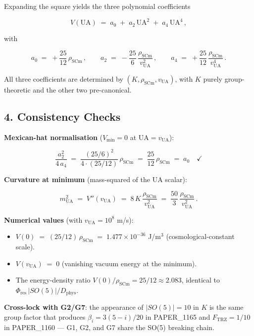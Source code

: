 \documentclass[
]{article}
\providecommand{\tightlist}{%
  \setlength{\itemsep}{0pt}\setlength{\parskip}{0pt}}
\begin{document}
Expanding the square yields the three polynomial coefficients

\[ V(\mathrm{UA}) \;=\; a_0 \;+\; a_2\,\mathrm{UA}^{2} \;+\; a_4\,\mathrm{UA}^{4}\,, \]

with

\[ a_0 \;=\; +\frac{25}{12}\,\rho_{\mathrm{SCm}}\,,\qquad
   a_2 \;=\; -\frac{25}{6}\,\frac{\rho_{\mathrm{SCm}}}{v_{\mathrm{UA}}^{2}}\,,\qquad
   a_4 \;=\; +\frac{25}{12}\,\frac{\rho_{\mathrm{SCm}}}{v_{\mathrm{UA}}^{4}}\,. \]

All three coefficients are determined by
\((K, \rho_{\mathrm{SCm}}, v_{\mathrm{UA}})\), with \(K\) purely
group-theoretic and the other two pre-canonical.

\subsection{4. Consistency Checks}\label{consistency-checks}

\textbf{Mexican-hat normalisation} (\(V_{\min} = 0\) at
\(\mathrm{UA}=v_{\mathrm{UA}}\)):

\[ \frac{a_2^{2}}{4\,a_4} \;=\; \frac{(25/6)^{2}}{4 \cdot (25/12)}\,\rho_{\mathrm{SCm}}
   \;=\; \frac{25}{12}\,\rho_{\mathrm{SCm}} \;=\; a_0 \quad\checkmark \]

\textbf{Curvature at minimum} (mass-squared of the UA scalar):

\[ m_{\mathrm{UA}}^{2} \;=\; V''(v_{\mathrm{UA}})
   \;=\; 8\,K\,\frac{\rho_{\mathrm{SCm}}}{v_{\mathrm{UA}}^{2}}
   \;=\; \frac{50}{3}\,\frac{\rho_{\mathrm{SCm}}}{v_{\mathrm{UA}}^{2}}\,. \]

\textbf{Numerical values} (with \(v_{\mathrm{UA}} = 10^{8}\) m/s):

\begin{itemize}
\tightlist
\item
  \(V(0) \;=\; (25/12)\,\rho_{\mathrm{SCm}} \;=\; 1.477 \times 10^{-36}\)
  J/m\(^3\) (cosmological-constant scale).
\item
  \(V(v_{\mathrm{UA}}) \;=\; 0\) (vanishing vacuum energy at the
  minimum).
\item
  The energy-density ratio
  \(V(0)/\rho_{\mathrm{SCm}} = 25/12 \approx 2.083\), identical to
  \(\Phi_{\mathrm{res}}\,|SO(5)|/D_{\mathrm{phys}}\).
\end{itemize}

\textbf{Cross-lock with G2/G7}: the appearance of \(|SO(5)|=10\) in
\(K\) is the same group factor that produces \(\beta_i = 3(5-i)/20\) in
PAPER\_1165 and \(F_{\mathrm{TRZ}} = 1/10\) in PAPER\_1160 --- G1, G2,
and G7 share the SO(5) breaking chain.
\end{document}
